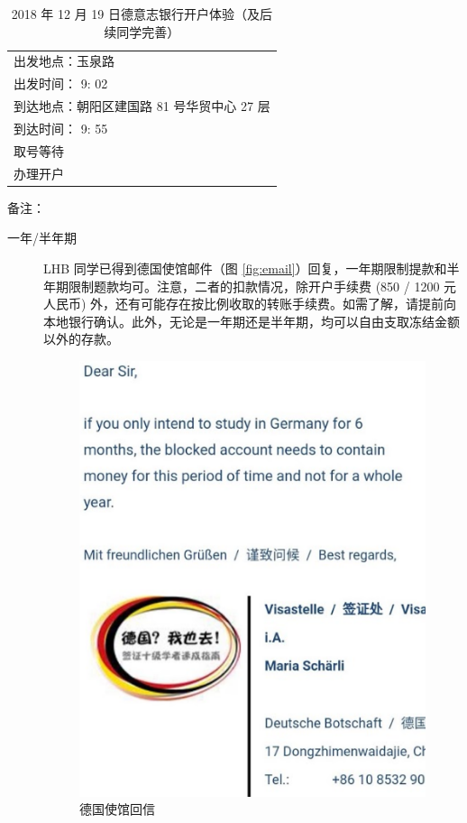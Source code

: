 \documentclass[oneside,final]{book}
\begin{document}
\begin{appendices}
\begin{table}[htbp]
\caption{2018 年 12 月 19 日德意志银行开户体验（及后续同学完善）}
\label{tb:opening-Dec-19}
\centering
\begin{tabular}{l}
\toprule
出发地点：玉泉路 \\
出发时间： 9: 02 \\
到达地点：朝阳区建国路 81 号华贸中心 27 层 \\
到达时间： 9: 55 \\
取号等待 \\
办理开户 \\ \bottomrule
\end{tabular}
\end{table}
\noindent
备注：
\begin{description}
\item[一年/半年期] LHB 同学已得到德国使馆邮件（图 \ref{fig:email}）回复，一年期限制提款和半年期限制题款均可。注意，二者的扣款情况，除开户手续费 (850 / 1200 元人民币) 外，还有可能存在按比例收取的转账手续费。如需了解，请提前向本地银行确认。此外，无论是一年期还是半年期，均可以自由支取冻结金额以外的存款。
\begin{figure}[htbp]
  \centering
  \includegraphics[height=.5\textheight]{email-from-Visa}
  \caption{德国使馆回信}

\end{figure}
\end{description}
\end{appendices}
\end{document}
